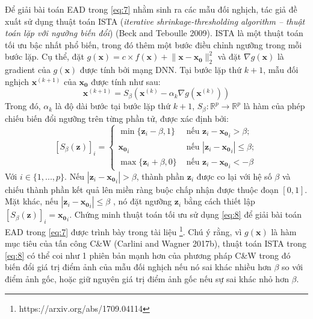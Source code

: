 Để giải bài toán EAD trong \ref{eq:7} nhằm sinh ra các mẫu đối nghịch, tác giả đề
xuất sử dụng thuật toán ISTA (\textit{iterative shrinkage-thresholding algorithm – thuật toán lặp 
với ngưỡng biến đổi}) (Beck and Teboulle 2009). ISTA là một thuật toán tối ưu bậc nhất
phổ biến, trong đó thêm một bước điều chỉnh ngưỡng trong mỗi bước lặp. Cụ thể, 
đặt $g(\mathbf{x}) = c \times f(\mathbf{x}) + \lVert \mathbf{x} - \mathbf{x_0} \rVert_2^2$
và đặt $\nabla g(\mathbf{x})$ là gradient của $g(\mathbf{x})$ được tính bởi mạng DNN. 
Tại bước lặp thứ $k+1$, mẫu đối nghịch $\mathbf{x}^{(k+1)}$ của $\mathbf{x_0}$ được tính 
như sau:
\begin{equation}
    \label{eq:8}
    \mathbf{x}^{(k+1)} = S_{\beta} (\mathbf{x}^{(k)} - \alpha_k \nabla g(\mathbf{x}^{(k)}))
\end{equation}
Trong đó, $\alpha_k$ là độ dài bước tại bước lặp thứ $k+1$, $S_{\beta} : \mathbb{R}^p \to 
\mathbb{R}^p$ là hàm của phép chiếu biến đổi ngưỡng trên từng phần tử, được xác định bởi:
\begin{equation}
    \label{eq:9}
    [S_{\beta}(\mathbf{z})]_i = 
    \begin{cases}
        \min \{ \mathbf{z}_i - \beta, 1 \} &\text{ nếu } \mathbf{z}_i - \mathbf{x_0}_i  > \beta; \\
        \mathbf{x_0}_i &\text{ nếu } |\mathbf{z}_i - \mathbf{x_0}_i| \leq \beta; \\
        \max \{ \mathbf{z}_i + \beta, 0 \} &\text{ nếu } \mathbf{z}_i - \mathbf{x_0}_i < -\beta
    \end{cases}
\end{equation}
Với $i \in \{ 1, ..., p \}$. Nếu $|\mathbf{z}_i - \mathbf{x_0}_i| > \beta$, thành phần 
$\mathbf{z}_i$ được co lại với hệ số $\beta$ và chiếu thành phần kết quả lên miền ràng buộc 
chấp nhận được thuộc đoạn $[0,1]$. Mặt khác, nếu $|\mathbf{z}_i - \mathbf{x_0}_i| \leq \beta$
, nó đặt ngưỡng $\mathbf{z}_i$ bằng cách thiết lập $[S_{\beta}(\mathbf{z})]_i = \mathbf{x_0}_i$.
Chứng minh thuật toán tối ưu sử dụng \ref{eq:8} để giải bài toán EAD trong \ref{eq:7}
được trình bày trong tài liệu \footnote{https://arxiv.org/abs/1709.04114}. Chú ý rằng, vì $g(\mathbf{x})$ là hàm mục tiêu của tấn công C\&W (Carlini and Wagner 2017b), thuật toán ISTA trong \ref{eq:8} có thể coi như 1 phiên bản mạnh hơn của phương pháp C\&W trong đó biến đổi giá trị điểm ảnh của mẫu đối nghịch nếu nó sai khác nhiều hơn $\beta$ so với điểm ảnh gốc, hoặc giữ nguyên giá trị điểm ảnh gốc nếu sự sai khác nhỏ hơn $\beta$.

